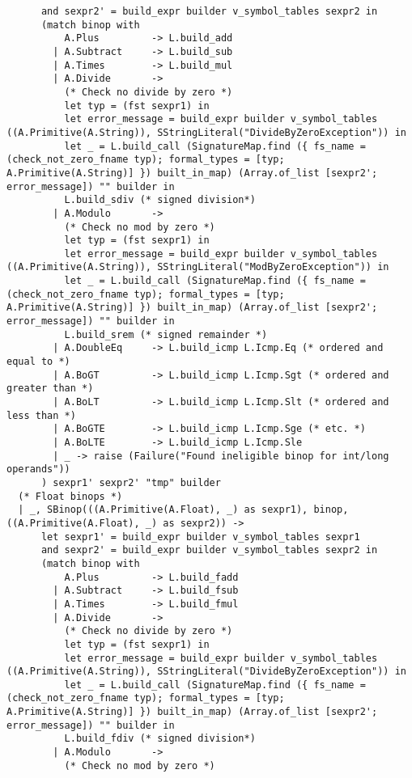 \documentclass{article}
\begin{document}
\begin{verbatim}
      and sexpr2' = build_expr builder v_symbol_tables sexpr2 in
      (match binop with
          A.Plus         -> L.build_add
        | A.Subtract     -> L.build_sub
        | A.Times        -> L.build_mul
        | A.Divide       ->
          (* Check no divide by zero *)
          let typ = (fst sexpr1) in
          let error_message = build_expr builder v_symbol_tables ((A.Primitive(A.String)), SStringLiteral("DivideByZeroException")) in
          let _ = L.build_call (SignatureMap.find ({ fs_name = (check_not_zero_fname typ); formal_types = [typ; A.Primitive(A.String)] }) built_in_map) (Array.of_list [sexpr2'; error_message]) "" builder in
          L.build_sdiv (* signed division*)
        | A.Modulo       ->
          (* Check no mod by zero *)
          let typ = (fst sexpr1) in
          let error_message = build_expr builder v_symbol_tables ((A.Primitive(A.String)), SStringLiteral("ModByZeroException")) in
          let _ = L.build_call (SignatureMap.find ({ fs_name = (check_not_zero_fname typ); formal_types = [typ; A.Primitive(A.String)] }) built_in_map) (Array.of_list [sexpr2'; error_message]) "" builder in
          L.build_srem (* signed remainder *)
        | A.DoubleEq     -> L.build_icmp L.Icmp.Eq (* ordered and equal to *)
        | A.BoGT         -> L.build_icmp L.Icmp.Sgt (* ordered and greater than *)
        | A.BoLT         -> L.build_icmp L.Icmp.Slt (* ordered and less than *)
        | A.BoGTE        -> L.build_icmp L.Icmp.Sge (* etc. *)
        | A.BoLTE        -> L.build_icmp L.Icmp.Sle 
        | _ -> raise (Failure("Found ineligible binop for int/long operands"))
      ) sexpr1' sexpr2' "tmp" builder
  (* Float binops *)
  | _, SBinop(((A.Primitive(A.Float), _) as sexpr1), binop, ((A.Primitive(A.Float), _) as sexpr2)) ->
      let sexpr1' = build_expr builder v_symbol_tables sexpr1
      and sexpr2' = build_expr builder v_symbol_tables sexpr2 in
      (match binop with
          A.Plus         -> L.build_fadd
        | A.Subtract     -> L.build_fsub
        | A.Times        -> L.build_fmul
        | A.Divide       ->
          (* Check no divide by zero *)
          let typ = (fst sexpr1) in
          let error_message = build_expr builder v_symbol_tables ((A.Primitive(A.String)), SStringLiteral("DivideByZeroException")) in
          let _ = L.build_call (SignatureMap.find ({ fs_name = (check_not_zero_fname typ); formal_types = [typ; A.Primitive(A.String)] }) built_in_map) (Array.of_list [sexpr2'; error_message]) "" builder in
          L.build_fdiv (* signed division*)
        | A.Modulo       ->
          (* Check no mod by zero *)

\end{verbatim}
\end{document}
